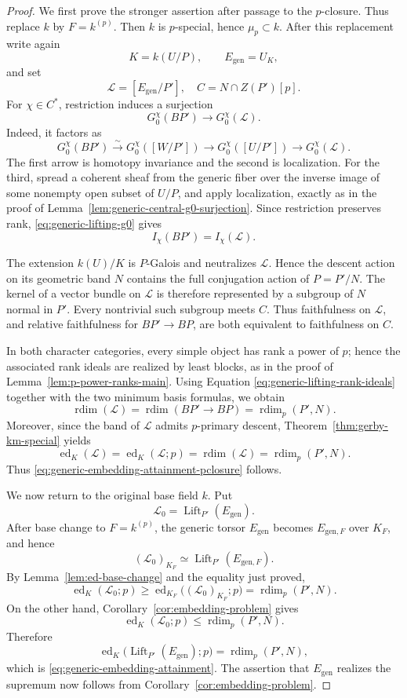 \documentclass[11pt,reqno]{amsart}
\numberwithin{equation}{section}
\theoremstyle{plain}
\theoremstyle{definition}
\def\cL{{\mathcal L}}
\def\ra{{\rightarrow}}
\def\rdim{{\operatorname{rdim}}}
\def\ed{{\operatorname{ed}}}
\begin{document}
\begin{proof}
We first prove the stronger assertion after passage to the $p$-closure.
Thus replace $k$ by $F=k^{(p)}$.  Then $k$ is $p$-special, hence
$\mu_p\subset k$.  After this replacement write again
\[
K=k(U/P),
\qquad
E_{\mathrm{gen}}=U_K,
\]
and set
\[
\cL=[E_{\mathrm{gen}}/P'],
\quad C=N\cap Z(P')[p].
\]
For $\chi\in C^*$, restriction induces a surjection
\begin{equation}\label{eq:generic-lifting-g0}
G_0^\chi(BP')\ra G_0^\chi(\cL).
\end{equation}
Indeed, it factors as
\[
G_0^\chi(BP')
\xrightarrow{\sim}G_0^\chi([W/P'])
\ra G_0^\chi([U/P'])
\ra G_0^\chi(\cL).
\]
The first arrow is homotopy invariance and the second is localization.
For the third, spread a coherent sheaf from the generic fiber over the
inverse image of some nonempty open subset of $U/P$, and apply localization,
exactly as in the proof of
Lemma~\ref{lem:generic-central-g0-surjection}.  Since restriction preserves rank,
\eqref{eq:generic-lifting-g0} gives
\begin{equation}\label{eq:generic-lifting-rank-ideals}
I_\chi(BP')=I_\chi(\cL).
\end{equation}

The extension $k(U)/K$ is $P$-Galois and neutralizes $\cL$.  Hence
the descent action on its geometric band $N$ contains the full
conjugation action of $P=P'/N$.  The kernel of a vector bundle on
$\cL$ is therefore represented by a subgroup of $N$ normal in
$P'$.  Every nontrivial such subgroup meets $C$.  Thus faithfulness on
$\cL$, and relative faithfulness for $BP'\to BP$, are both equivalent
to faithfulness on $C$.

In both character categories, every simple object has rank a power of $p$; hence the associated rank ideals are realized by least blocks, as in the proof of Lemma~\ref{lem:p-power-ranks-main}.  Using Equation \eqref{eq:generic-lifting-rank-ideals} together with the two minimum basis formulas, we obtain
\[
\rdim(\cL)=\rdim(BP'\to BP)=\rdim_p(P',N).
\]
Moreover, since the band of $\cL$ admits $p$-primary descent, Theorem~\ref{thm:gerby-km-special} yields
\[
\ed_K(\cL)=\ed_K(\cL;p)=\rdim(\cL)=\rdim_p(P',N).
\]
Thus \eqref{eq:generic-embedding-attainment-pclosure} follows.

We now return to the original base field $k$.  Put
\[
\cL_0=\operatorname{Lift}_{P'}(E_{\mathrm{gen}}).
\]
After base change to $F=k^{(p)}$, the generic torsor
$E_{\mathrm{gen}}$ becomes $E_{\mathrm{gen},F}$ over $K_F$, and hence
\[
(\cL_0)_{K_F}\simeq
\operatorname{Lift}_{P'}(E_{\mathrm{gen},F}).
\]
By Lemma~\ref{lem:ed-base-change} and the equality just proved,
\[
\ed_K(\cL_0;p)
\ge
\ed_{K_F}\bigl((\cL_0)_{K_F};p\bigr)
=
\rdim_p(P',N).
\]
On the other hand, Corollary~\ref{cor:embedding-problem} gives
\[
\ed_K(\cL_0;p)\le \rdim_p(P',N).
\]
Therefore
\[
\ed_K\bigl(\operatorname{Lift}_{P'}(E_{\mathrm{gen}});p\bigr)
=\rdim_p(P',N),
\]
which is \eqref{eq:generic-embedding-attainment}.  The assertion that
$E_{\mathrm{gen}}$ realizes the supremum now follows from
Corollary~\ref{cor:embedding-problem}.
\end{proof}
\end{document}
